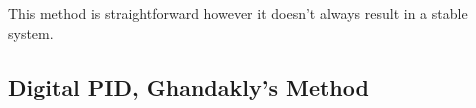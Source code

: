 \documentclass{article}
\newcommand{\sincludepdf}[2][]{
	
}
\begin{document}
This method is straightforward however it doesn't always result in
a stable system.

\sincludepdf[pages={10},
		pagecommand=\subsection{Mapping: $z=e^{sT}$}\label{sec:mapzest}\subsubsection*{Example 1}
		]{scan/11221301.pdf}

\sincludepdf[pages={1},
			pagecommand=\subsubsection*{Example 2}
	]{scan/11231301.pdf}

\sincludepdf[pages={9},
			pagecommand=\subsection{Mapping: Forward, Backward, Trapezoid}\subsubsection*{Example 1}
	]{scan/11211301.pdf}

\sincludepdf[pages={10},
			pagecommand=\subsubsection*{Example 2}
	]{scan/11211301.pdf}

\sincludepdf[pages={8},
			pagecommand=\subsubsection*{Example 3}
		]{scan/11221301.pdf}

\sincludepdf[pages={9},
			pagecommand=\subsubsection*{Example 4}
		]{scan/11221301.pdf}

\subsection{Digital PID, Ghandakly's Method}


\end{document}
